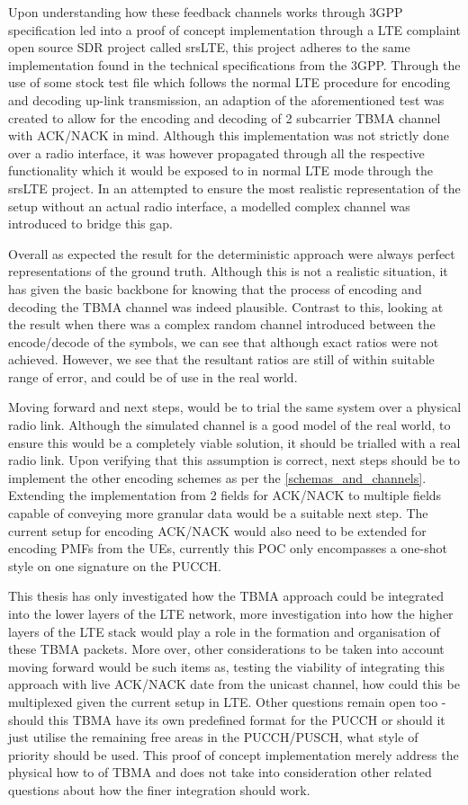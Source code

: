 \documentclass{article}
\begin{document}
Upon understanding how these feedback channels works through 3GPP specification led into a proof of concept implementation through a LTE complaint open source SDR project called srsLTE, this project adheres to the same implementation found in the technical specifications from the 3GPP. Through the use of some stock test file which follows the normal LTE procedure for encoding and decoding up-link transmission, an adaption of the aforementioned test was created to allow for the encoding and decoding of 2 subcarrier TBMA channel with ACK/NACK in mind. Although this implementation was not strictly done over a radio interface, it was however propagated through all the respective functionality which it would be exposed to in normal LTE mode through the srsLTE project. In an attempted to ensure the most realistic representation of the setup without an actual radio interface, a modelled complex channel was introduced to bridge this gap. 

Overall as expected the result for the deterministic approach were always perfect representations of the ground truth. Although this is not a realistic situation, it has given the basic backbone for knowing that the process of encoding and decoding the TBMA channel was indeed plausible. Contrast to this, looking at the result when there was a complex random channel introduced between the encode/decode of the symbols, we can see that although exact ratios were not achieved. However, we see that the resultant ratios are still of within suitable range of error, and could be of use in the real world. 

Moving forward and next steps, would be to trial the same system over a physical radio link. Although the simulated channel is a good model of the real world, to ensure this would be a completely viable solution, it should be trialled with a real radio link. Upon verifying that this assumption is correct, next steps should be to implement the other encoding schemes as per the \cref{schemas_and_channels}. Extending the implementation from 2 fields for ACK/NACK to multiple fields capable of conveying more granular data would be a suitable next step. The current setup for encoding ACK/NACK would also need to be extended for encoding PMFs from the UEs, currently this POC only encompasses a one-shot style on one signature on the PUCCH. 

This thesis has only investigated how the TBMA approach could be integrated into the lower layers of the LTE network, more investigation into how the higher layers of the LTE stack would play a role in the formation and organisation of these TBMA packets. More over, other considerations to be taken into account moving forward would be such items as, testing the viability of integrating this approach with live ACK/NACK date from the unicast channel, how could this be multiplexed given the current setup in LTE. Other questions remain open too - should this TBMA have its own predefined format for the PUCCH or should it just utilise the remaining free areas in the PUCCH/PUSCH, what style of priority should be used. This proof of concept implementation merely address the physical how to of TBMA and does not take into consideration other related questions about how the finer integration should work.
\end{document}
